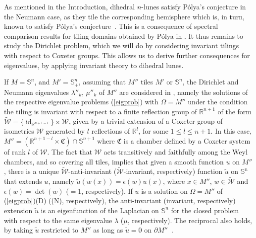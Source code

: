 \documentclass[11pt,a4paper,times]{amsart}
\theoremstyle{plain}
\theoremstyle{definition}
\numberwithin{equation}{section}
\DeclareMathOperator\id{id}
\begin{document}
{As mentioned in the Introduction, dihedral $n$-lunes satisfy P\'{o}lya's conjecture in the Neumann case, as they tile the corresponding
hemisphere which is, in turn, known to satisfy P\'{o}lya's conjecture~\cite{blps,fms}. This is a consequence of spectral comparison
results for tiling domains obtained by P\'{o}lya in \cite{poly2}.  It thus remains to study the
Dirichlet problem, which we will do by considering invariant tilings with respect to Coxeter groups. This allows us to derive further
consequences for eigenvalues, by applying invariant theory to dihedral lunes.

If $M=\mathbb{S}^n$, and  $M'=\mathbb{S}^n_+$,  assuming that $M''$ tiles $M'$ or $\mathbb{S}^n$,  the Dirichlet and Neumann  eigenvalues $\lambda''_k$, $\mu''_k$  of $M''$ are considered in \cite{bb},   namely the solutions of the  respective eigenvalue problems (\ref{eigprob}) with $\Omega=M''$ 
under the condition the tiling is invariant with respect to a finite reflection group  of $\mathbb{R}^{n+1}$
of  the form $\tilde{\mathcal{W}}=\{\id_{\mathbb{R}^{n+1-l}}\}\times\mathcal{W}$, given by a trivial extension of a {Coxeter} group of isometries $\mathcal{W}$ generated by $l$  reflections of $\mathbb{R}^l$, for some $1\leq l\leq n+1$.
 In this case,   $M''=(\mathbb{R}^{n+1-l}\times \mathfrak{C})\cap \mathbb{S}^{n+1}$ where $\mathfrak{C}$ is a chamber defined by a Coxeter system of rank $l$ of  $\mathcal{W}$. The fact that  $\mathcal{W}$ acts transitively and faithfully among the Weyl chambers, and so covering all tiles, implies that given a smooth function $u$ on $M''$, there is a unique  $\tilde{\mathcal{W}}$-anti-invariant
($\tilde{\mathcal{W}}$-invariant, respectively) function $\tilde{u}$ on $\mathbb{S}^n$ that extends $u$, namely $\tilde{u}(w(x))=\epsilon(w)u(x)$, where $x\in M''$, $w\in \tilde{\mathcal{W}}$ and $\epsilon(w)=\det(w)$ ($=1$, respectively).     
If  $u$ is a solution  on $\Omega=M''$ of (\ref{eigprob})(D) ((N), respectively), the  anti-invariant (invariant, respectively) extension  $\tilde{u}$  is an eigenfunction
of the Laplacian on $\mathbb{S}^n$ for the closed problem  with respect to the same eigenvalue $\lambda$ ($\mu$, respectively).
The reciprocal also holds, by taking $\tilde{u}$ restricted  to $M''$ {as long as $\tilde{u}=0$ on $\partial M''$}~\cite[Prop.\ 7]{bb}. 

}
\end{document}
